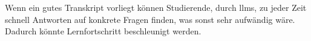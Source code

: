 Wenn ein gutes Transkript vorliegt können Studierende, durch \acp{llm}, zu jeder Zeit schnell Antworten auf konkrete Fragen finden, was sonst sehr aufwändig wäre. Dadurch könnte Lernfortschritt beschleunigt werden.






